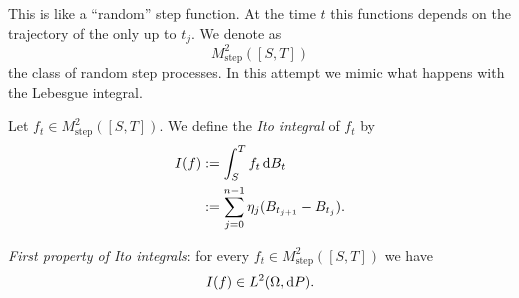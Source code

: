\documentclass[crop=false, class=article]{standalone}
\begin{document}
This is like a ``random'' step function. At the time $t$ this functions depends on the trajectory of the \brm{} only up to $t_{j}$. We denote as 
\begin{equation*}
	M_{\mathrm{step}}^{2}([S,T])
\end{equation*}
the class of random step processes. In this attempt we mimic what happens with the Lebesgue integral.
\begin{definition}
	Let $f_t\in M_{\mathrm{step}}^2([S,T])$. We define the \emph{Ito integral} of $f_t$ by
	\begin{align*}
		I(f) & :=\int_{S}^{T}f_{t}\mathop{}\!\mathrm{d} B_{t} \\
		 & :=\sum_{j=0}^{n-1}\eta_j(B_{t_{j+1}}-B_{t_{j}}).
	\end{align*}
\end{definition}
\begin{proposition}
	\emph{First property of Ito integrals}: for every $f_t\in M^{2}_{\mathrm{step}}([S,T])$ we have
	\begin{equation*}
		I(f)\in L^2(\Omega, \mathop{}\!\mathrm{d} P).
	\end{equation*}
\end{proposition}
\end{document}
